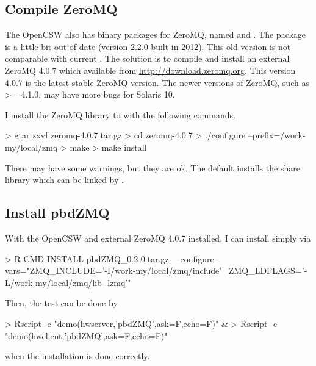 \subsection[Compile ZeroMQ]{Compile ZeroMQ}
\label{sec:compile_zeromq}
The OpenCSW also has binary packages for ZeroMQ, named  and
.
The package is a little bit out of date (version 2.2.0 built in 2012).
This old version is not comparable with current .
The solution is to compile and install an external ZeroMQ 4.0.7
which available from \url{http://download.zeromq.org}.
This version 4.0.7 is the latest stable ZeroMQ version.
The newer versions of ZeroMQ, such as >= 4.1.0, may have more bugs
for Solaris 10.

I install the ZeroMQ library to  with
the following commands.
\begin{Code}
> gtar zxvf zeromq-4.0.7.tar.gz
> cd zeromq-4.0.7
> ./configure --prefix=/work-my/local/zmq 
> make
> make install
\end{Code}
There may have some warnings, but they are ok. The default installs
the share library which can be linked by .


\subsection[Install pbdZMQ]{Install pbdZMQ}
\label{sec:install_pbdzmq}
With the OpenCSW and external ZeroMQ 4.0.7 installed, I can install
 simply via
\begin{Code}
> R CMD INSTALL pbdZMQ_0.2-0.tar.gz \
  --configure-vars="ZMQ_INCLUDE='-I/work-my/local/zmq/include' \
                    ZMQ_LDFLAGS='-L/work-my/local/zmq/lib -lzmq'"
\end{Code}
Then, the test can be done by
\begin{Code}
> Rscript -e "demo(hwserver,'pbdZMQ',ask=F,echo=F)" &
> Rscript -e "demo(hwclient,'pbdZMQ',ask=F,echo=F)"
\end{Code}
when the  installation is done correctly.

